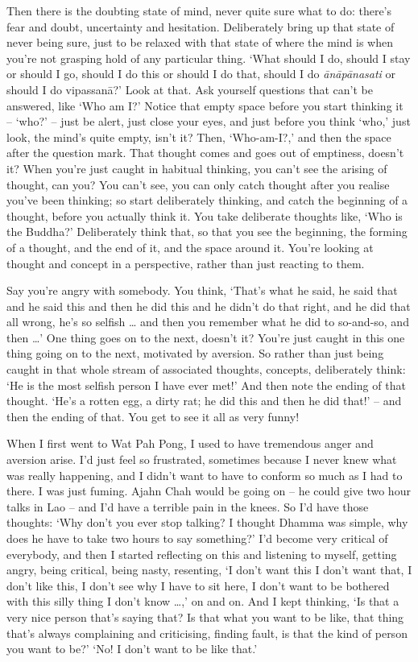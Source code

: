 Then there is the doubting state of mind, never quite sure what to do: there's fear and doubt, uncertainty and hesitation. Deliberately bring up that state of never being sure, just to be relaxed with that state of where the mind is when you're not grasping hold of any particular thing. `What should I do, should I stay or should I go, should I do this or should I do that, should I do \textit{ānāpānasati} or should I do vipassanā?' Look at that. Ask yourself questions that can't be answered, like `Who am I?' Notice that empty space before you start thinking it -- `who?' -- just be alert, just close your eyes, and just before you think `who,' just look, the mind's quite empty, isn't it? Then, `Who-am-I?,' and then the space after the question mark. That thought comes and goes out of emptiness, doesn't it? When you're just caught in habitual thinking, you can't see the arising of thought, can you? You can't see, you can only catch thought after you realise you've been thinking; so start deliberately thinking, and catch the beginning of a thought, before you actually think it. You take deliberate thoughts like, `Who is the Buddha?' Deliberately think that, so that you see the beginning, the forming of a thought, and the end of it, and the space around it. You're looking at thought and concept in a perspective, rather than just reacting to them.

Say you're angry with somebody. You think, `That's what he said, he said that and he said this and then he did this and he didn't do that right, and he did that all wrong, he's so selfish \ldots{} and then you remember what he did to so-and-so, and then \ldots{}' One thing goes on to the next, doesn't it? You're just caught in this one thing going on to the next, motivated by aversion. So rather than just being caught in that whole stream of associated thoughts, concepts, deliberately think: `He is the most selfish person I have ever met!' And then note the ending of that thought. `He's a rotten egg, a dirty rat; he did this and then he did that!' -- and then the ending of that. You get to see it all as very funny!

When I first went to Wat Pah Pong, I used to have tremendous anger and aversion arise. I'd just feel so frustrated, sometimes because I never knew what was really happening, and I didn't want to have to conform so much as I had to there. I was just fuming. Ajahn Chah would be going on -- he could give two hour talks in Lao -- and I'd have a terrible pain in the knees. So I'd have those thoughts: `Why don't you ever stop talking? I thought Dhamma was simple, why does he have to take two hours to say something?' I'd become very critical of everybody, and then I started reflecting on this and listening to myself, getting angry, being critical, being nasty, resenting, `I don't want this I don't want that, I don't like this, I don't see why I have to sit here, I don't want to be bothered with this silly thing I don't know \ldots{},' on and on. And I kept thinking, `Is that a very nice person that's saying that? Is that what you want to be like, that thing that's always complaining and criticising, finding fault, is that the kind of person you want to be?' `No! I don't want to be like that.'

